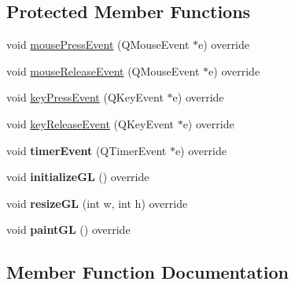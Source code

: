 \subsection*{Protected Member Functions}
\begin{DoxyCompactItemize}
\item 
void \mbox{\hyperlink{class_application_1_1_c_window_application_aef3f8b560cf3193a189c144835f2d587}{mouse\+Press\+Event}} (Q\+Mouse\+Event $\ast$e) override
\item 
void \mbox{\hyperlink{class_application_1_1_c_window_application_a83bbf972b387045d653452d7d141b9d6}{mouse\+Release\+Event}} (Q\+Mouse\+Event $\ast$e) override
\item 
void \mbox{\hyperlink{class_application_1_1_c_window_application_af1af209c30d9f7b591da4aedcd4a03df}{key\+Press\+Event}} (Q\+Key\+Event $\ast$e) override
\item 
void \mbox{\hyperlink{class_application_1_1_c_window_application_accb1924fd48cf14b2fe467f65766b52e}{key\+Release\+Event}} (Q\+Key\+Event $\ast$e) override
\item 
\mbox{\label{class_application_1_1_c_window_application_ab591f7f6a68b752a4df2ecffebf22c04}} 
void {\bfseries timer\+Event} (Q\+Timer\+Event $\ast$e) override
\item 
\mbox{\label{class_application_1_1_c_window_application_ab6f0e2b97311923b75018f95fdb9f530}} 
void {\bfseries initialize\+GL} () override
\item 
\mbox{\label{class_application_1_1_c_window_application_a800ed87ab31e543abb36254ea89e873e}} 
void {\bfseries resize\+GL} (int w, int h) override
\item 
\mbox{\label{class_application_1_1_c_window_application_a988cd6144cfeec0b0dd2513c56d4b226}} 
void {\bfseries paint\+GL} () override
\end{DoxyCompactItemize}


\subsection{Member Function Documentation}
\mbox{\label{class_application_1_1_c_window_application_af1af209c30d9f7b591da4aedcd4a03df}} 
